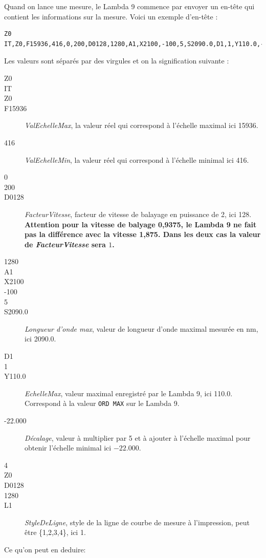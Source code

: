 \documentclass[a4paper, 12pt]{article}
\begin{document}
Quand on lance une mesure, le Lambda 9 commence par envoyer un en-tête qui contient les informations sur la mesure. Voici un exemple d'en-tête :
\begin{lstlisting}
Z0
IT,Z0,F15936,416,0,200,D0128,1280,A1,X2100,-100,5,S2090.0,D1,1,Y110.0,-22.000,4,Z0,D0128,1280,L1
\end{lstlisting}
Les valeurs sont séparés par des virgules et on la signification suivante :
\begin{description}
	\item[Z0]
	\item[IT]
	\item[Z0]
	\item[F15936] \emph{ValEchelleMax}, la valeur réel qui correspond à l'échelle maximal ici 15936.
	\item[416] \emph{ValEchelleMin}, la valeur réel qui correspond à l'échelle minimal ici 416.
	\item[0]
	\item[200]
	\item[D0128] \emph{FacteurVitesse}, facteur de vitesse de balayage en puissance de 2, ici 128.  \textbf{Attention pour la vitesse de balyage 0,9375, le Lambda 9 ne fait pas la différence avec la vitesse 1,875. Dans les deux cas la valeur de \emph{FacteurVitesse} sera $1$.}
	\item[1280]
	\item[A1]
	\item[X2100]
	\item[-100]
	\item[5]
	\item[S2090.0] \emph{Longueur d'onde max}, valeur de longueur d'onde maximal mesurée en nm, ici 2090.0.
	\item[D1]
	\item[1]
	\item[Y110.0] \emph{EchelleMax}, valeur maximal enregistré par le Lambda 9, ici 110.0.
		Correspond à la valeur \verb|ORD MAX| sur le Lambda 9.
	\item[-22.000] \emph{Décalage}, valeur à multiplier par 5 et à ajouter à l'échelle maximal pour obtenir l'échelle minimal ici $-22.000$.
	\item[4]
	\item[Z0]
	\item[D0128]
	\item[1280]
	\item[L1] \emph{StyleDeLigne}, style de la ligne de courbe de mesure à l'impression, peut être \{1,2,3,4\}, ici 1.

\end{description}
Ce qu'on peut en deduire:
\end{document}
